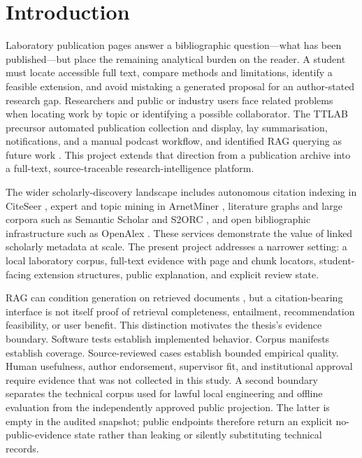 \chapter{Introduction}
\label{ch:introduction}

Laboratory publication pages answer a bibliographic question---what has been published---but place the remaining analytical burden on the reader. A student must locate accessible full text, compare methods and limitations, identify a feasible extension, and avoid mistaking a generated proposal for an author-stated research gap. Researchers and public or industry users face related problems when locating work by topic or identifying a possible collaborator. The TTLAB precursor automated publication collection and display, lay summarisation, notifications, and a manual podcast workflow, and identified RAG querying as future work \cite{narine2025automating}. This project extends that direction from a publication archive into a full-text, source-traceable research-intelligence platform.

The wider scholarly-discovery landscape includes autonomous citation indexing in CiteSeer \cite{giles1998citeseer}, expert and topic mining in ArnetMiner \cite{tang2008arnetminer}, literature graphs and large corpora such as Semantic Scholar and S2ORC \cite{ammar2018literaturegraph,lo2020s2orc}, and open bibliographic infrastructure such as OpenAlex \cite{priem2022openalex}. These services demonstrate the value of linked scholarly metadata at scale. The present project addresses a narrower setting: a local laboratory corpus, full-text evidence with page and chunk locators, student-facing extension structures, public explanation, and explicit review state.

RAG can condition generation on retrieved documents \cite{lewis2020rag}, but a citation-bearing interface is not itself proof of retrieval completeness, entailment, recommendation feasibility, or user benefit. This distinction motivates the thesis's evidence boundary. Software tests establish implemented behavior. Corpus manifests establish coverage. Source-reviewed cases establish bounded empirical quality. Human usefulness, author endorsement, supervisor fit, and institutional approval require evidence that was not collected in this study. A second boundary separates the technical corpus used for lawful local engineering and offline evaluation from the independently approved public projection. The latter is empty in the audited snapshot; public endpoints therefore return an explicit no-public-evidence state rather than leaking or silently substituting technical records.

